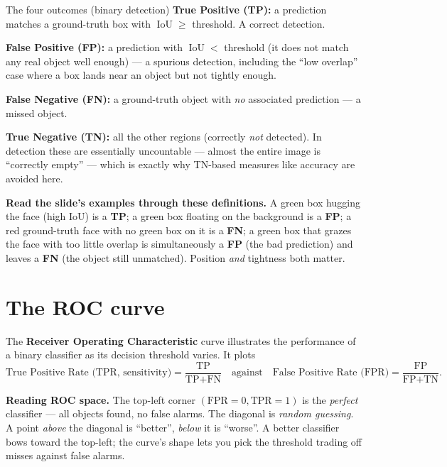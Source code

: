 \documentclass{report}
\DeclareMathOperator{\IoU}{IoU}
\begin{document}
\begin{defbox}{The four outcomes (binary detection)}
\textbf{True Positive (TP):} a prediction matches a ground-truth box with
$\IoU \geq$ threshold. A correct detection.

\medskip
\textbf{False Positive (FP):} a prediction with $\IoU <$ threshold (it does not
match any real object well enough) --- a spurious detection, including the
``low overlap'' case where a box lands near an object but not tightly enough.

\medskip
\textbf{False Negative (FN):} a ground-truth object with \emph{no} associated
prediction --- a missed object.

\medskip
\textbf{True Negative (TN):} all the other regions (correctly \emph{not}
detected). In detection these are essentially uncountable --- almost the entire
image is ``correctly empty'' --- which is exactly why TN-based measures like
accuracy are avoided here.
\end{defbox}

\begin{keybox}
\textbf{Read the slide's examples through these definitions.} A green box
hugging the face (high IoU) is a \textbf{TP}; a green box floating on the
background is a \textbf{FP}; a red ground-truth face with no green box on it is
a \textbf{FN}; a green box that grazes the face with too little overlap is
simultaneously a \textbf{FP} (the bad prediction) and leaves a \textbf{FN} (the
object still unmatched). Position \emph{and} tightness both matter.
\end{keybox}

\section{The ROC curve}

The \textbf{Receiver Operating Characteristic} curve illustrates the
performance of a binary classifier as its decision threshold varies. It plots
\[
\text{True Positive Rate (TPR, sensitivity)} =
\frac{\text{TP}}{\text{TP}+\text{FN}}
\quad\text{against}\quad
\text{False Positive Rate (FPR)} = \frac{\text{FP}}{\text{FP}+\text{TN}} .
\]

\begin{keybox}
\textbf{Reading ROC space.} The top-left corner $(\text{FPR}=0,
\text{TPR}=1)$ is the \emph{perfect} classifier --- all objects found, no false
alarms. The diagonal is \emph{random guessing}. A point \emph{above} the
diagonal is ``better'', \emph{below} it is ``worse''. A better classifier bows
toward the top-left; the curve's shape lets you pick the threshold trading off
misses against false alarms.
\end{keybox}
\end{document}
